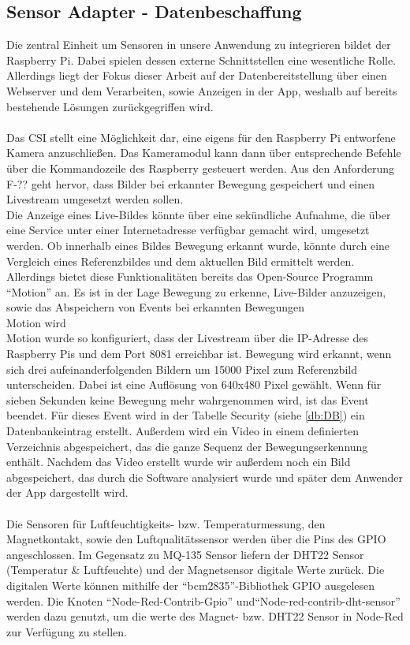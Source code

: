 \subsection{Sensor Adapter - Datenbeschaffung}
Die zentral Einheit um Sensoren in unsere Anwendung zu integrieren bildet der Raspberry Pi. Dabei spielen dessen externe Schnittstellen eine wesentliche Rolle. Allerdings liegt der Fokus dieser Arbeit auf der Datenbereitstellung über einen Webserver und dem Verarbeiten, sowie Anzeigen in der App, weshalb auf bereits bestehende Lösungen zurückgegriffen wird.
\\\\Das \acf{CSI} stellt eine Möglichkeit dar, eine eigens für den Raspberry Pi entworfene Kamera anzuschließen. Das Kameramodul kann dann über entsprechende Befehle über die Kommandozeile des Raspberry gesteuert werden. Aus den Anforderung F-?? geht hervor, dass Bilder bei erkannter Bewegung gespeichert und einen Livestream umgesetzt werden sollen.\\Die Anzeige eines Live-Bildes könnte über eine sekündliche Aufnahme, die über eine Service unter einer Internetadresse verfügbar gemacht wird, umgesetzt werden. Ob innerhalb eines Bildes Bewegung erkannt wurde, könnte durch eine Vergleich eines Referenzbildes und dem aktuellen Bild ermittelt werden.\\Allerdings bietet diese Funktionalitäten bereits das Open-Source Programm \enquote{Motion} an. Es ist in der Lage Bewegung zu erkenne, Live-Bilder anzuzeigen, sowie das Abspeichern von Events bei erkannten Bewegungen\cite{motion:Motion}\\
Motion wird 
\\Motion wurde so konfiguriert, dass der Livestream über die \ac{IP}-Adresse des Raspberry Pis und dem Port 8081 erreichbar ist. Bewegung wird erkannt, wenn sich drei aufeinanderfolgenden Bildern um 15000 Pixel zum Referenzbild unterscheiden. Dabei ist eine Auflösung von 640x480 Pixel gewählt. Wenn für sieben Sekunden keine Bewegung mehr wahrgenommen wird, ist das Event beendet. Für dieses Event wird in der Tabelle Security (siehe \autoref{db:DB}) ein Datenbankeintrag erstellt. Außerdem wird ein Video in einem definierten Verzeichnis abgespeichert, das die ganze Sequenz der Bewegungserkennung enthält. Nachdem das Video erstellt wurde wir außerdem noch ein Bild abgespeichert, das durch die Software analysiert wurde und später dem Anwender der App dargestellt wird.
\\\\
Die Sensoren für Luftfeuchtigkeits- bzw. Temperaturmessung, den Magnetkontakt, sowie den Luftqualitätssensor werden über die Pins des \ac{GPIO} angeschlossen. Im Gegensatz zu MQ-135 Sensor liefern der DHT22 Sensor (Temperatur \& Luftfeuchte) und der Magnetsensor digitale Werte zurück. Die digitalen Werte können mithilfe der \enquote{bcm2835}-Bibliothek \ac{GPIO} ausgelesen werden\cite{bcm:Bcm}. Die Knoten \enquote{Node-Red-Contrib-Gpio}\cite{node:GPIO} und\enquote{Node-red-contrib-dht-sensor}\cite{node:DHT22} werden dazu genutzt, um die werte des Magnet- bzw. DHT22 Sensor in Node-Red zur Verfügung zu stellen. 
